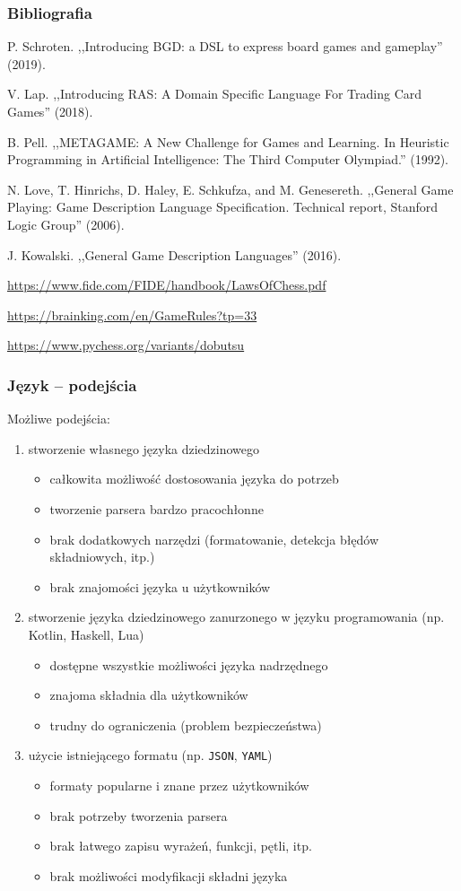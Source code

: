 \documentclass{beamer}
\newcommand\pro{\item[$+$]}
\newcommand\con{\item[$-$]}
\begin{document}
\begin{frame}
	\frametitle{Bibliografia}
	
	\begin{thebibliography}{9}
		 P. Schroten. ,,Introducing BGD: a DSL to express board games and gameplay'' (2019).

		 V. Lap. ,,Introducing RAS: A Domain Specific Language For Trading Card Games'' (2018).

		  B. Pell. ,,METAGAME: A New Challenge for Games and Learning. In Heuristic Programming in Artificial Intelligence: The Third Computer Olympiad.'' (1992).

		  N. Love, T. Hinrichs, D. Haley, E. Schkufza, and M. Genesereth. ,,General Game Playing: Game Description Language Specification. Technical report, Stanford Logic Group'' (2006).

		 J. Kowalski. ,,General Game Description Languages'' (2016).

		 \url{https://www.fide.com/FIDE/handbook/LawsOfChess.pdf}

		 \url{https://brainking.com/en/GameRules?tp=33}

		 \url{https://www.pychess.org/variants/dobutsu}
	\end{thebibliography}
\end{frame}

\begin{frame}
	\frametitle{Język -- podejścia}
	Możliwe podejścia:
	\begin{enumerate}
		\item stworzenie własnego języka dziedzinowego
		      \begin{itemize}
			      \pro całkowita możliwość dostosowania języka do potrzeb
			      \con tworzenie parsera bardzo pracochłonne
			      \con brak dodatkowych narzędzi (formatowanie, detekcja błędów składniowych, itp.)
			      \con brak znajomości języka u użytkowników
		      \end{itemize}
		\item stworzenie języka dziedzinowego zanurzonego w języku programowania (np. Kotlin, Haskell, Lua)
		      \begin{itemize}
			      \pro dostępne wszystkie możliwości języka nadrzędnego
			      \pro znajoma składnia dla użytkowników
			      \con trudny do ograniczenia (problem bezpieczeństwa)
		      \end{itemize}
		      \framebreak
		\item użycie istniejącego formatu (np. {\tt JSON}, {\tt YAML})
		      \begin{itemize}
			      \pro formaty popularne i znane przez użytkowników
			      \pro brak potrzeby tworzenia parsera
			      \con brak łatwego zapisu wyrażeń, funkcji, pętli, itp.
			      \con brak możliwości modyfikacji składni języka
		      \end{itemize}
	\end{enumerate}
\end{frame}
\end{document}
